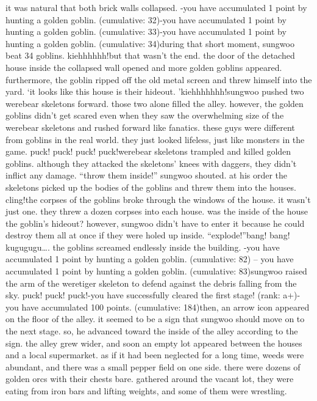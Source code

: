it was natural that both brick walls collapsed.
-you have accumulated 1 point by hunting a golden goblin.
 (cumulative: 32)-you have accumulated 1 point by hunting a golden goblin.
 (cumulative: 33)-you have accumulated 1 point by hunting a golden goblin.
 (cumulative: 34)during that short moment, sungwoo beat 34 goblins.
kiehhhhhh!but that wasn’t the end.
 the door of the detached house inside the collapsed wall opened and more golden goblins appeared.
 furthermore, the goblin ripped off the old metal screen and threw himself into the yard.
‘it looks like this house is their hideout.
’kiehhhhhhh!sungwoo pushed two werebear skeletons forward.
 those two alone filled the alley.
however, the golden goblins didn’t get scared even when they saw the overwhelming size of the werebear skeletons and rushed forward like fanatics.
 these guys were different from goblins in the real world.
 they just looked lifeless, just like monsters in the game.
puck! puck! puck! puck!werebear skeletons trampled and killed golden goblins.
 although they attacked the skeletons’ knees with daggers, they didn’t inflict any damage.
“throw them inside!” sungwoo shouted.
at his order the skeletons picked up the bodies of the goblins and threw them into the houses.
cling!the corpses of the goblins broke through the windows of the house.
 it wasn’t just one.
 they threw a dozen corpses into each house.
was the inside of the house the goblin’s hideout? however, sungwoo didn’t have to enter it because he could destroy them all at once if they were holed up inside.
“explode!”bang! bang! kugugugu….
the goblins screamed endlessly inside the building.
-you have accumulated 1 point by hunting a golden goblin.
 (cumulative: 82)
– you have accumulated 1 point by hunting a golden goblin.
 (cumulative: 83)sungwoo raised the arm of the weretiger skeleton to defend against the debris falling from the sky.
puck! puck! puck!-you have successfully cleared the first stage! (rank: a+)-you have accumulated 100 points.
 (cumulative: 184)then, an arrow icon appeared on the floor of the alley.
 it seemed to be a sign that sungwoo should move on to the next stage.
 so, he advanced toward the inside of the alley according to the sign.
the alley grew wider, and soon an empty lot appeared between the houses and a local supermarket.
 as if it had been neglected for a long time, weeds were abundant, and there was a small pepper field on one side.
there were dozens of golden orcs with their chests bare.
 gathered around the vacant lot, they were eating from iron bars and lifting weights, and some of them were wrestling.
